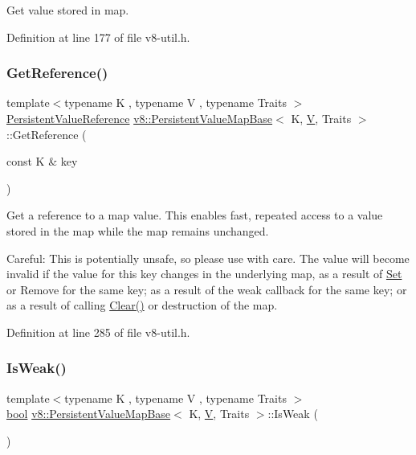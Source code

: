 Get value stored in map. 

Definition at line 177 of file v8-\/util.\+h.

\mbox{\label{classv8_1_1PersistentValueMapBase_a52e74c69b94c7ce77a65af9f32d68af4}} 
\subsubsection{\texorpdfstring{Get\+Reference()}{GetReference()}}
{\footnotesize\ttfamily template$<$typename K , typename V , typename Traits $>$ \\
\mbox{\hyperlink{classv8_1_1PersistentValueMapBase_1_1PersistentValueReference}{Persistent\+Value\+Reference}} \mbox{\hyperlink{classv8_1_1PersistentValueMapBase}{v8\+::\+Persistent\+Value\+Map\+Base}}$<$ K, \mbox{\hyperlink{classV}{V}}, Traits $>$\+::Get\+Reference (\begin{DoxyParamCaption}\item[{const K \&}]{key }\end{DoxyParamCaption})\hspace{0.3cm}{\ttfamily [inline]}}

Get a reference to a map value. This enables fast, repeated access to a value stored in the map while the map remains unchanged.

Careful\+: This is potentially unsafe, so please use with care. The value will become invalid if the value for this key changes in the underlying map, as a result of \mbox{\hyperlink{classv8_1_1Set}{Set}} or Remove for the same key; as a result of the weak callback for the same key; or as a result of calling \mbox{\hyperlink{classv8_1_1PersistentValueMapBase_a1bf074e7a7c24713c9a3d40ddce89e74}{Clear()}} or destruction of the map. 

Definition at line 285 of file v8-\/util.\+h.

\mbox{\label{classv8_1_1PersistentValueMapBase_a9f824b13dd30605589508db2740dd678}} 
\subsubsection{\texorpdfstring{Is\+Weak()}{IsWeak()}}
{\footnotesize\ttfamily template$<$typename K , typename V , typename Traits $>$ \\
\mbox{\hyperlink{classbool}{bool}} \mbox{\hyperlink{classv8_1_1PersistentValueMapBase}{v8\+::\+Persistent\+Value\+Map\+Base}}$<$ K, \mbox{\hyperlink{classV}{V}}, Traits $>$\+::Is\+Weak (\begin{DoxyParamCaption}{ }\end{DoxyParamCaption})\hspace{0.3cm}{\ttfamily [inline]}}

